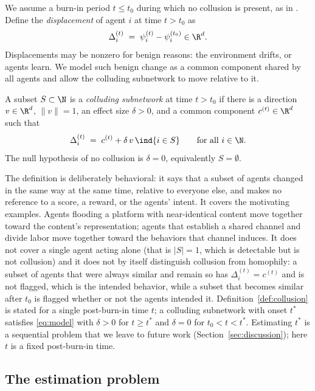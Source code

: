We assume a burn-in period $t\le t_0$ during which no collusion is present, as in \citet{helm2026control}. Define the \emph{displacement} of agent $i$ at time $t>t_0$ as
\begin{equation}
\Delta_i^{(t)} \;=\; \psi_i^{(t)} - \psi_i^{(t_0)} \in \R^d .
\end{equation}
Displacements may be nonzero for benign reasons: the environment drifts, or agents learn. We model such benign change as a common component shared by all agents and allow the colluding subnetwork to move relative to it.

\begin{definition}
\label{def:collusion}
A subset $S\subset\N$ is a \emph{colluding subnetwork} at time $t>t_0$ if there is a direction $v\in\R^d$, $\|v\|=1$, an effect size $\delta>0$, and a common component $c^{(t)}\in\R^d$ such that
\begin{equation}
\label{eq:model}
\Delta_i^{(t)} \;=\; c^{(t)} + \delta\, v\,\ind\{i\in S\} \qquad\text{for all } i\in\N .
\end{equation}
The null hypothesis of no collusion is $\delta = 0$, equivalently $S=\emptyset$.
\end{definition}

The definition is deliberately behavioral: it says that a subset of agents changed in the same way at the same time, relative to everyone else, and makes no reference to a score, a reward, or the agents' intent. It covers the motivating examples. Agents flooding a platform with near-identical content move together toward the content's representation; agents that establish a shared channel and divide labor move together toward the behaviors that channel induces. It does not cover a single agent acting alone (that is $|S|=1$, which is detectable but is not collusion) and it does not by itself distinguish collusion from homophily: a subset of agents that were always similar and remain so has $\Delta_i^{(t)} = c^{(t)}$ and is not flagged, which is the intended behavior, while a subset that becomes similar after $t_0$ is flagged whether or not the agents intended it. Definition~\ref{def:collusion} is stated for a single post-burn-in time $t$; a colluding subnetwork with onset $t^*$ satisfies \eqref{eq:model} with $\delta>0$ for $t\ge t^*$ and $\delta=0$ for $t_0<t<t^*$. Estimating $t^*$ is a sequential problem that we leave to future work (Section~\ref{sec:discussion}); here $t$ is a fixed post-burn-in time.

\subsection{The estimation problem}
\label{sec:problem}

